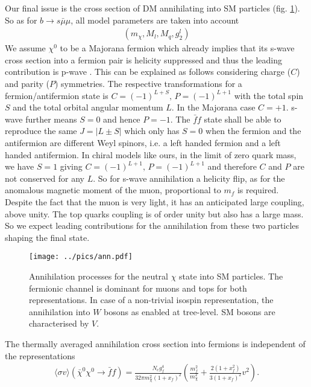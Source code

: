Our final issue is the cross section of DM annihilating into SM particles (fig. \ref{pic_annihilation}). So as for $b\rightarrow s \bar\mu\mu$, all model parameters are taken into
account
\begin{align}
 \left(m_\chi, M_l, M_q, g^l_2\right)
\end{align}
We assume $\chi^0$ to be a Majorana fermion which already implies that its s-wave cross section into a fermion pair is helicity suppressed and 
thus the leading contribution is p-wave \cite{1307.8120}. This can be explained as follows considering charge ($C$) and parity ($P$) symmetries.
The respective transformations for a fermion/antifermion state is $C=(-1)^{L+S},\,P=(-1)^{L+1}$ with the total spin $S$ and the total orbital angular
momentum $L$. 
In the Majorana case $C=+1$. s-wave further means $S=0$ and hence $P=-1$. The $\bar f f$ state shall be able to reproduce the same $J=|L\pm S|$ 
which only has $S=0$ when the fermion and the antifermion are different Weyl spinors, i.e. a left handed fermion and a left handed antifermion.
In chiral models like ours, in the limit of zero quark mass, we have $S=1$ giving $C=(-1)^{L+1},\,P=(-1)^{L+1}$ and therefore $C$ and $P$ are not 
conserved for any $L$. So for s-wave annihilation a helicity flip, as for the anomalous magnetic moment of the muon, proportional to $m_f$ is 
required. Despite the fact that the muon is very light, it has an anticipated large coupling, above unity. The top quarks coupling is of order unity
but also has a large mass. So we expect leading contributions for the annihilation from these two particles shaping the final state.
\begin{figure}[t]
 \texttt{[image: ../pics/ann.pdf]}
 \caption{Annihilation processes for the neutral $\chi$ state into SM particles. The fermionic channel is dominant for muons and tops for both 
 representations. In case of a non-trivial isospin representation, the annihilation into $W$ bosons as enabled at tree-level. 
 SM bosons are characterised by $V$.}
 \label{pic_annihilation}
\end{figure}
The thermally averaged annihilation cross section into fermions is independent of the representations \cite{1503.01500}
\begin{align}
 \langle \sigma v \rangle \left(\bar \chi^0 \chi^0 \rightarrow \bar f f\right) = \frac{N_c g_f^4}{32\pi m_\chi^2\left(1+x_f\right)^2} \left(\frac{m_f^2}{m_\chi^2} + \frac{2\left(1+x_f^2\right)}{3\left(1+x_f\right)^2} v^2\right)  .
\end{align}
